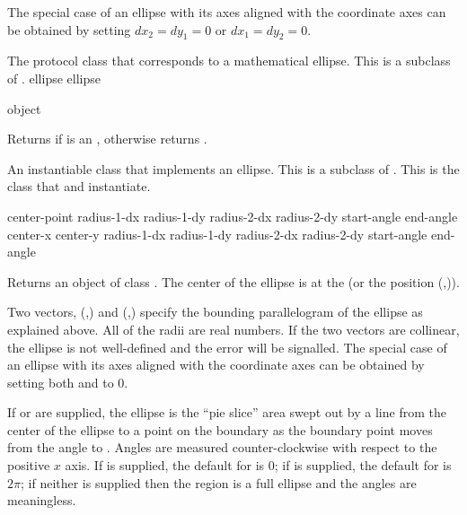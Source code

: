 The special case of an ellipse with its axes aligned with the coordinate axes
can be obtained by setting $dx_2 = dy_1 = 0$ or $dx_1 = dy_2 = 0$.



The protocol class that corresponds to a mathematical ellipse.  This is a
subclass of .
 {ellipse} {ellipse}

 {object}

Returns  if  is an , otherwise returns
.


An instantiable class that implements an ellipse.  This is a subclass of
.  This is the class that  and 
instantiate.
\Immutable

  {center-point 
                        radius-1-dx radius-1-dy radius-2-dx radius-2-dy
                        \key start-angle end-angle}
 {center-x center-y 
                        radius-1-dx radius-1-dy radius-2-dx radius-2-dy 
                        \key start-angle end-angle}

Returns an object of class .  The center of the ellipse is
at the   (or the position
(,)).

Two vectors, (,) and
(,) specify the bounding parallelogram of the
ellipse as explained above.  All of the radii are real numbers.  If the two
vectors are collinear, the ellipse is not well-defined and the
 error will be signalled.  The special case of an
ellipse with its axes aligned with the coordinate axes can be obtained by
setting both  and  to 0.

If  or  are supplied, the ellipse is the ``pie
slice'' area swept out by a line from the center of the ellipse to a point on
the boundary as the boundary point moves from the angle  to
.  Angles are measured counter-clockwise with respect to the
positive $x$ axis.  If  is supplied, the default for
 is $0$; if  is supplied, the default for
 is $2\pi$; if neither is supplied then the region is a full
ellipse and the angles are meaningless.

